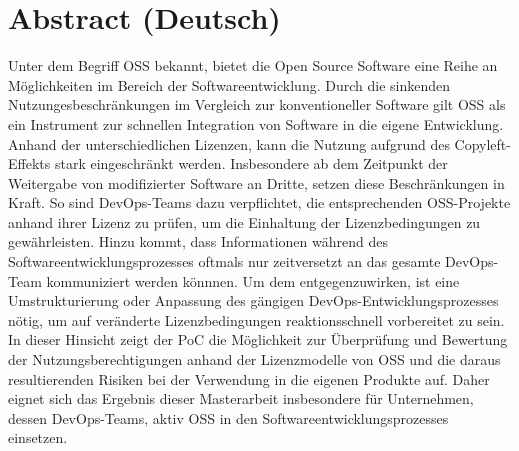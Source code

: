 \documentclass[12pt,titlepage]{report}
\begin{document}
\newpage 
\vspace*{-2cm}
\setlength{\cftaftertoctitleskip}{0,8cm}
\tableofcontents

\newpage
\chapter*{Abstract (Deutsch)}
   Unter dem Begriff OSS bekannt, bietet die Open Source Software eine Reihe an Möglichkeiten im Bereich der Softwareentwicklung. Durch die sinkenden Nutzungesbeschränkungen im Vergleich zur konventioneller Software gilt OSS als ein Instrument zur schnellen Integration von Software in die eigene Entwicklung. Anhand der unterschiedlichen Lizenzen, kann die Nutzung aufgrund des Copyleft-Effekts stark eingeschränkt werden. Insbesondere ab dem Zeitpunkt der Weitergabe von modifizierter Software an Dritte, setzen diese Beschränkungen in Kraft. So sind DevOps-Teams dazu verpflichtet, die entsprechenden OSS-Projekte anhand ihrer Lizenz zu prüfen, um die Einhaltung der Lizenzbedingungen zu gewährleisten. Hinzu kommt, dass Informationen während des Softwareentwicklungsprozesses oftmals nur zeitversetzt an das gesamte DevOps-Team kommuniziert werden könnnen. Um dem entgegenzuwirken, ist eine Umstrukturierung oder Anpassung des gängigen DevOps-Entwicklungsprozesses nötig, um auf veränderte Lizenzbedingungen reaktionsschnell vorbereitet zu sein. In dieser Hinsicht zeigt der PoC die Möglichkeit zur Überprüfung und Bewertung der Nutzungsberechtigungen anhand der Lizenzmodelle von OSS und die daraus resultierenden Risiken bei der Verwendung in die eigenen Produkte auf. Daher eignet sich das Ergebnis dieser Masterarbeit insbesondere für Unternehmen, dessen DevOps-Teams, aktiv OSS in den Softwareentwicklungsprozesses einsetzen. 
 
   
\end{document}

